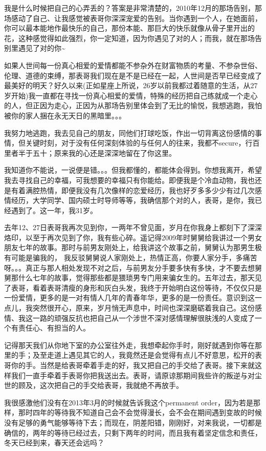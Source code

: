 \documentclass[12pt]{book}
\begin{document}
我是什么时候把自己的心弄丢的？答案是非常清楚的，2010年12月的那场告别，那场感动了自己、让我感觉被表哥你深深宠爱的告别。当你遇到一个人，在她面前，你可以最本能地作最快乐的自己，那份本能、那巨大的快乐就像从骨子里开出的花，这种感觉得如此强烈，你一定知道，因为你遇见了对的人；而我，就在那场告别里遇见了对的你\textasciitilde{}~

如果人世间每一份真心相爱的爱情都能不参杂外在财富物质的考量、不参杂世俗、伦理、道德的束缚，那表哥我们现在是不是已经在一起，人世间是否早已经变成了最美好的明天？好久以来(正如星座上所说，26岁以前我都过着随意的生活，从27岁开始)我一直都在寻找一份真心相爱的爱情，特殊的经历把自己练就成一个走心的人，但正因为走心，正因为从那场告别里体会到了无比的愉悦，我想逃跑，我怕被你的家人捆在永无天日的黑暗里。。。

我努力地逃跑，我去见自己的朋友，同他们打球吃饭，作出一切背离这份感情的事情，但关键时刻，对于没有任何深刻体验的与任何人的往来，我都不secure，行百里者半于五十；原来我的心还是深深地留在了你这里。

我知道你不能说，一说便是错。。。但我都懂的，都能体会得到。你想我离开，希望我去寻找自己的幸福，可我想要的幸福只有你能给。即便我是个冷血动物，我也还是有着满腔热情，即便我没有几次像样的恋爱经历，我也好歹多多少少有过几次感情经历，大学同学、国内硕士时导师等等，我确信那个对的人，表哥，是你，我已经遇到了。这一年，我31岁。

去年12、27日表哥我再次见到你，一两年不曾见面，岁月在你我身上都刻下了深深烙印，以至于再次见到了你，我有些心碎。遥记得2009年时舅舅给我讲过一个男女朋友七年的故事。那时与前男友刚处上，给我讲这个故事之前，舅舅认为那男生极有可能是骗我的， 我反驳舅舅说人家刚处上，热情正高，你要人家分手，多痛苦呀。。。真正与那人相处发现不对之后，与前男友分手要多快有多快，才不要去想舅舅那什么七年的故事，觉得那些都是猥琐男专门用来骗女生的。五年过去，那天见了表哥，看着表哥清瘦的身形和灰白头发，我终于开始明白这份等待，不仅仅只是一份爱情，更多的是一对有情人几年的青春年华，更多的是一份责任。意识到这一点儿，我突然很开心，原来，岁月悄无声息中，时间也深深磨砺着我自己。这份感情、我这一路的顽强反抗也把自己从一个涉世不深对感情理解很肤浅的人变成了一个有责任心、有担当的人。

记得那天我们从你地下室的办公室往外走，我想牵起你手时，刚好就遇到你等在那里的手；及至走道上遇见其它的人，我竟然还是会觉得有点儿不好意思，松开的表哥你的手。当然是给表哥牵着手走的好，我又把自己的手交给了表哥。接下来就这样我们一直手牵着手表哥你把我送出去。表哥，请原谅那期间我些许的叛逆与对尘世的顾及，这次把自己的手交给表哥，我就绝不再放手。

我很感激他们没有在2013年3月的时候就告诉我这个permanent order，因为若是那样，那时四年的等待我不知道自己会不会觉得漫长，会不会在期间遇到变故的时候没有足够的勇气能够等待下去；而现在，阴差阳错，刚刚好，对来我说，一切都是确信的，两年的等待已经过去，只剩下两年的时间，而且我有着坚定信念和责任，冬天已经到来，春天还会远吗？
\end{document}
